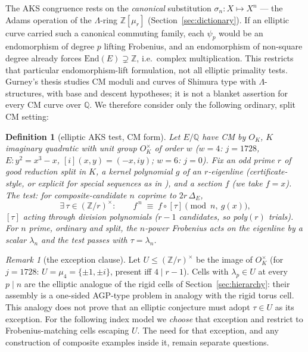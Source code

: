 \documentclass[11pt]{article}
\newtheorem{definition}[theorem]{Definition}
\theoremstyle{remark}
\newtheorem{remark}[theorem]{Remark}
\newcommand{\Z}{\mathbb{Z}}
\newcommand{\Q}{\mathbb{Q}}
\begin{document}
The AKS congruence rests on the \emph{canonical} substitution
$\sigma_n : X \mapsto X^n$ --- the Adams operation of the $\Lambda$-ring
$\Z[\mu_r]$ (Section~\ref{sec:dictionary}). If an elliptic curve carried
such a canonical commuting family, each $\psi_p$ would be an endomorphism
of degree $p$ lifting Frobenius, and an endomorphism of non-square degree
already forces $\mathrm{End}(E) \supsetneq \Z$, i.e.\ complex
multiplication. This restricts that particular endomorphism-lift formulation,
not all elliptic primality tests. Gurney's thesis \cite{BorgerGurney} studies
CM moduli and curves of Shimura type with $\Lambda$-structures, with base and
descent hypotheses; it is not a blanket assertion for every CM curve over
$\Q$. We therefore consider only the following ordinary, split CM setting:

\begin{definition}[elliptic AKS test, CM form]\label{def:elltest}
Let $E/\Q$ have CM by $O_K$, $K$ imaginary quadratic with unit group
$O_K^\times$ of order $w$ ($w = 4$: $j = 1728$, $E : y^2 = x^3 - x$,
$[i](x,y) = (-x, iy)$; $w = 6$: $j = 0$). Fix an odd prime $r$ of good
reduction split in $K$, a kernel polynomial $g$ of an $r$-eigenline
(certificate-style, or explicit for special sequences as in
\cite{GK12}), and a section $f$ (we take $f = x$). The test: for
composite-candidate $n$ coprime to $2r\,\Delta_E$,
\[
\exists\, \tau \in (\Z/r)^\times : \qquad
f^{\,n} \;\equiv\; f \circ [\tau] \pmod{n,\ g(x)},
\]
$[\tau]$ acting through division polynomials ($r - 1$ candidates, so
poly$(r)$ trials). For $n$ prime, ordinary and split, the $n$-power
Frobenius acts on the eigenline by a scalar $\lambda_n$ and the test
passes with $\tau = \lambda_n$.
\end{definition}

\begin{remark}[the exception clause]\label{rem:ellclause}
Let $U \le (\Z/r)^\times$ be the image of $O_K^\times$ (for $j = 1728$:
$U = \mu_4 = \{\pm1, \pm i\}$, present iff $4 \mid r-1$). Cells with
$\lambda_p \in U$ at every $p \mid n$ are the elliptic analogue of the
rigid cells of Section~\ref{sec:hierarchy}: their assembly is a one-sided
AGP-type problem in analogy with the rigid torus cell. This analogy does not
prove that an elliptic conjecture must adopt $\tau\in U$ as its exception.
For the following index model we \emph{choose} that exception and restrict to
Frobenius-matching cells escaping $U$. The need for that exception, and any
construction of composite examples inside it, remain separate questions.
\end{remark}
\end{document}

